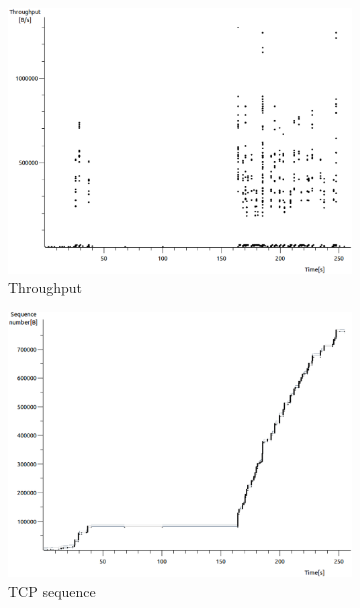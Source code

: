 \documentclass[conference,a4paper]{../../sty/IEEEtran}
\begin{document}
\begin{figure}
 \centering
 \begin{subfigure}[b]{0.2\textwidth}
  \includegraphics[width=\textwidth]{s8-1_th}
  \caption{Throughput}
 \end{subfigure}
 \begin{subfigure}[b]{0.2\textwidth}
  \includegraphics[width=\textwidth]{s8-1_seq}
  \caption{TCP sequence}
 \end{subfigure}
 \begin{subfigure}[b]{0.2\textwidth}

\end{subfigure}
\end{figure}
\end{document}
